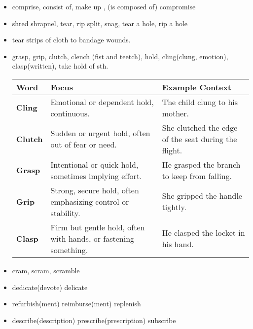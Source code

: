 \documentclass[a4paper,11pt,twoside]{book}
\begin{document}
\begin{itemize}
	\item comprise, consist of, make up , (is composed of) compromise 
	
	\item shred shrapnel, tear, rip split, snag, tear a hole, rip a hole
	
	\item tear strips of cloth to bandage wounds. 
	
	\item grasp, grip, clutch, clench (fist and teetch),  hold, cling(clung, emotion), clasp(written), take hold of sth.
	
	\begin{tabular}{|l|p{6cm}|p{6cm}|}
		\hline
		\textbf{Word}   & \textbf{Focus}                                                                                 & \textbf{Example Context}                                      \\ \hline
		\textbf{Cling}  & Emotional or dependent hold, continuous.                                                  & The child clung to his mother.                        \\ \hline
		\textbf{Clutch} & Sudden or urgent hold, often out of fear or need.                                         & She clutched the edge of the seat during the flight.  \\ \hline
		\textbf{Grasp}  & Intentional or quick hold, sometimes implying effort.                                     & He grasped the branch to keep from falling.           \\ \hline
		\textbf{Grip}   & Strong, secure hold, often emphasizing control or stability.                              & She gripped the handle tightly.                       \\ \hline
		\textbf{Clasp}  & Firm but gentle hold, often with hands, or fastening something.                          & He clasped the locket in his hand.                    \\ \hline
	\end{tabular}
	
	\item cram, scram, scramble
	
	\item dedicate(devote) delicate
	
	\item refurbish(ment) reimburse(ment) replenish
	
	\item describe(description) prescribe(prescription) subscribe
	

\end{itemize}
\end{document}
